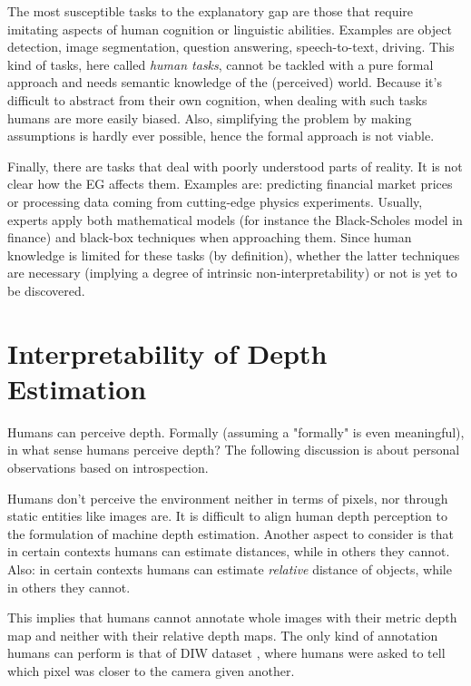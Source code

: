 The most susceptible tasks to the explanatory gap are those that require imitating aspects of human cognition or linguistic abilities.
Examples are object detection, image segmentation, question answering, speech-to-text, driving.
This kind of tasks, here called \textit{human tasks}, cannot be tackled with a pure formal approach and needs semantic knowledge of the (perceived) world.
Because it's difficult to abstract from their own cognition, when dealing with such tasks humans are more easily biased.
Also, simplifying the problem by making assumptions is hardly ever possible, hence the formal approach is not viable.

Finally, there are tasks that deal with poorly understood parts of reality.
It is not clear how the EG affects them.
Examples are: predicting financial market prices or processing data coming from cutting-edge physics experiments.
Usually, experts apply both mathematical models (for instance the Black-Scholes model in finance) and black-box techniques when approaching them.
Since human knowledge is limited for these tasks (by definition), whether the latter techniques are necessary (implying a degree of intrinsic non-interpretability) or not is yet to be discovered.

\section{Interpretability of Depth Estimation}
\label{sec:interpretability of depth estimation}
Humans can perceive depth.
Formally (assuming a "formally" is even meaningful), in what sense humans perceive depth?
The following discussion is about personal observations based on introspection.

Humans don't perceive the environment neither in terms of pixels, nor through static entities like images are.
It is difficult to align human depth perception to the formulation of machine depth estimation.
Another aspect to consider is that in certain contexts humans can estimate distances, while in others they cannot.
Also: in certain contexts humans can estimate \textit{relative} distance of objects, while in others they cannot.

This implies that humans cannot annotate whole images with their metric depth map and neither with their relative depth maps.
The only kind of annotation humans can perform is that of DIW dataset \cite{DIW}, where humans were asked to tell which pixel was closer to the camera given another.

